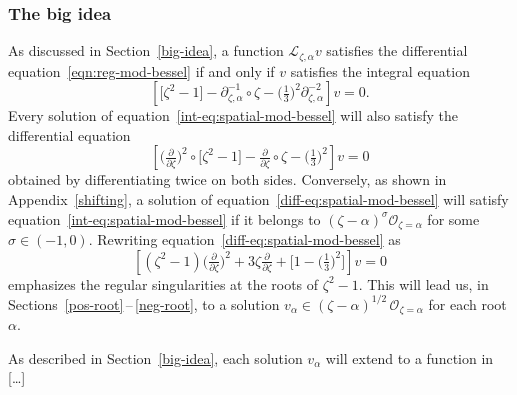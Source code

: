 \documentclass{article}
\newcommand{\fracderiv}[3]{\partial^{#1}_{#2, #3}}
\newcommand{\laplace}{\mathcal{L}}
\theoremstyle{definition}
\theoremstyle{plain}
\newenvironment{todo}{\color{Coral}}{\color{black}}
\newenvironment{revised}{\color{DarkBlue}}{\color{black}}
\begin{document}
\begin{revised}
\subsubsection{The big idea}\label{big-idea-airy}
%
As discussed in Section~\ref{big-idea}, a function $\laplace_{\zeta, \alpha} v$ satisfies the differential equation~\eqref{eqn:reg-mod-bessel} if and only if $v$ satisfies the integral equation
\begin{equation}\label{int-eq:spatial-mod-bessel}
\left[ \big[ \zeta^2 - 1 \big] - \fracderiv{-1}{\zeta}{\alpha} \circ \zeta - \big(\tfrac{1}{3}\big)^2 \fracderiv{-2}{\zeta}{\alpha} \right] v = 0.
\end{equation}
Every solution of equation~\eqref{int-eq:spatial-mod-bessel} will also satisfy the differential equation
\begin{equation}\label{diff-eq:spatial-mod-bessel}
\left[ \big(\tfrac{\partial}{\partial \zeta}\big)^2 \circ \big[ \zeta^2 - 1 \big] - \tfrac{\partial}{\partial \zeta} \circ \zeta - \big(\tfrac{1}{3}\big)^2 \right] v = 0
\end{equation}
obtained by differentiating twice on both sides. Conversely, as shown in Appendix~\ref{shifting}, a solution of equation~\eqref{diff-eq:spatial-mod-bessel} will satisfy equation~\eqref{int-eq:spatial-mod-bessel} if it belongs to $(\zeta - \alpha)^\sigma \mathcal{O}_{\zeta = \alpha}$ for some $\sigma \in (-1, 0)$. Rewriting equation~\eqref{diff-eq:spatial-mod-bessel} as
\[ \left[ (\zeta^2 - 1) \big(\tfrac{\partial}{\partial \zeta}\big)^2 + 3\zeta \tfrac{\partial}{\partial \zeta} + \big[ 1 - \big(\tfrac{1}{3}\big)^2 \big] \right] v = 0 \]
emphasizes the regular singularities at the roots of $\zeta^2 - 1$. This will lead us, in Sections~\ref{pos-root}\,--\,\ref{neg-root}, to a solution $v_\alpha \in (\zeta - \alpha)^{1/2}\,\mathcal{O}_{\zeta = \alpha}$ for each root $\alpha$.

As described in Section~\ref{big-idea}, each solution $v_\alpha$ will extend to a function in \begin{todo}[\ldots]\end{todo}
\end{revised}
\end{document}

